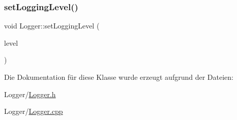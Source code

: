 \subsubsection{\texorpdfstring{set\+Logging\+Level()}{setLoggingLevel()}}
{\footnotesize\ttfamily void Logger\+::set\+Logging\+Level (\begin{DoxyParamCaption}\item[{\hyperlink{_logger_8h_aa5a9053636a30269210c54e734e0d583}{L\+O\+G\+\_\+\+L\+E\+V\+EL}}]{level }\end{DoxyParamCaption})}



Die Dokumentation für diese Klasse wurde erzeugt aufgrund der Dateien\+:\begin{DoxyCompactItemize}
\item 
Logger/\hyperlink{_logger_8h}{Logger.\+h}\item 
Logger/\hyperlink{_logger_8cpp}{Logger.\+cpp}\end{DoxyCompactItemize}
